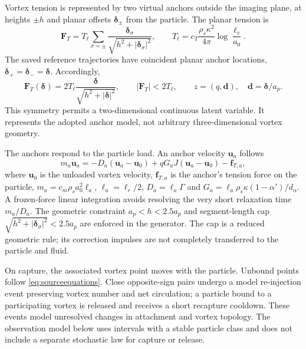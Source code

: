 \documentclass[11pt]{article}
\numberwithin{equation}{section}
\begin{document}
Vortex tension is represented by two virtual anchors outside the imaging plane, at heights $\pm h$ and planar offsets $\bm\delta_\pm$ from the particle. The planar tension is
\begin{equation}
 \mathbf F_T=T_\ell\sum_{\sigma=\pm}
 \frac{\bm\delta_\sigma}{\sqrt{h^2+|\bm\delta_\sigma|^2}},
 \qquad
 T_\ell=c_T\frac{\rho_s\kappa^2}{4\pi}\log\frac{\ell_v}{a_0}.
 \label{eq:anchors}
\end{equation}
The saved reference trajectories have coincident planar anchor locations, $\bm\delta_+=\bm\delta_-=\bm\delta$. Accordingly,
\begin{equation}
 \mathbf F_T(\bm\delta)=
 2T_\ell\frac{\bm\delta}{\sqrt{h^2+|\bm\delta|^2}},
 \qquad |\mathbf F_T|<2T_\ell,
 \qquad z=(q,\mathbf d),\quad\mathbf d=\bm\delta/a_p.
 \label{eq:latentgeometry}
\end{equation}
This symmetry permits a two-dimensional continuous latent variable. It represents the adopted anchor model, not arbitrary three-dimensional vortex geometry.

The anchors respond to the particle load. An anchor velocity $\mathbf u_a$ follows
\begin{equation}
 m_a\dot{\mathbf u}_a
 =-D_a(\mathbf u_a-\mathbf u_0)
  +qG_aJ(\mathbf u_a-\mathbf u_0)-\mathbf f_{T,a},
 \label{eq:anchordynamics}
\end{equation}
where $\mathbf u_0$ is the unloaded vortex velocity, $\mathbf f_{T,a}$ is the anchor's tension force on the particle, $m_a=c_m\rho_s a_0^2\ell_a$, $\ell_a=\ell_e/2$, $D_a=\ell_a\Gamma$ and $G_a=\ell_a\rho_s\kappa(1-\alpha')/d_\alpha$. A frozen-force linear integration avoids resolving the very short relaxation time $m_a/D_a$. The geometric constraint $a_p<h<2.5a_p$ and segment-length cap $\sqrt{h^2+|\bm\delta_\sigma|^2}<2.5a_p$ are enforced in the generator. The cap is a reduced geometric rule; its correction impulses are not completely transferred to the particle and fluid.

On capture, the associated vortex point moves with the particle. Unbound points follow \eqref{eq:sourceequations}. Close opposite-sign pairs undergo a model re-injection event preserving vortex number and net circulation; a particle bound to a participating vortex is released and receives a short recapture cooldown. These events model unresolved changes in attachment and vortex topology. The observation model below uses intervals with a stable particle class and does not include a separate stochastic law for capture or release.
\end{document}
